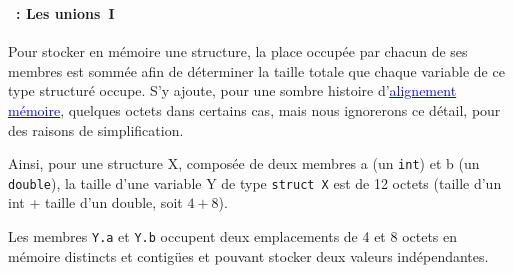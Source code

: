 \begin{frame}[containsverbatim]
  \frametitle{\secname}
  \framesubtitle{\subsecname~: Les unions~I}
  Pour stocker en mémoire une structure, la place occupée par chacun de ses membres est sommée afin de déterminer
  la taille totale que chaque variable de ce type structuré occupe. S'y ajoute, pour une sombre histoire 
  d'\href{http://fr.wikipedia.org/wiki/Alignement_en_m\%C3\%A9moire}{\textcolor{blue}{\underline{alignement mémoire}}},
  quelques octets dans certains cas, mais nous ignorerons ce détail, pour des raisons de simplification. 
  \vspace{0.5cm}
  \par
  Ainsi, pour une structure X, composée de deux membres a (un \verb|int|) et b (un \verb|double|), la taille 
  d'une variable Y de type \verb|struct X| est de 12 octets (taille d'un int + taille d'un double, soit $4 + 8$).
  \vspace{0.5cm}
  \par
  Les membres \verb|Y.a| et \verb|Y.b| occupent deux emplacements de 4 et 8 octets en mémoire distincts et contigües 
  et pouvant stocker deux valeurs indépendantes.
\end{frame}   

